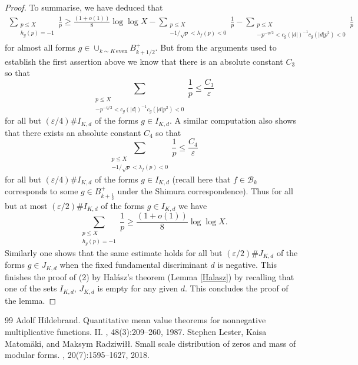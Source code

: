 \documentclass[10pt,a4paper]{amsart}
\newcommand\eps{\varepsilon}
\begin{document}
\begin{proof}
To summarise, we have deduced that 
\begin{align*}
\sum_{\substack{p\leq X\\
h_g(p)=-1}}\frac1p\geq\frac{(1+o(1))}{8}\log\log X-\sum_{\substack{p\leq X\\
-1/\sqrt p<\lambda_f(p)<0}}\frac1p-\sum_{\substack{p\leq X\\
-p^{-\eta/2}<c_g(|d|)^{-1}c_g(|d|p^2)<0}}\frac 1p
\end{align*}
for almost all forms $g\in\cup_{k\sim K\,\text{even}}B_{k+1/2}^+$. But from the arguments used to establish the first assertion above we know that there is an absolute constant $C_3$ so that
\[ 
\sum_{\substack{p\leq X\\
-p^{-\eta/2}<c_g(|d|)^{-1}c_g(|d|p^2)<0}}\frac 1p\leq\frac{C_3}{\varepsilon}\]
for all but $(\varepsilon/4)\# I_{K,d}$ of the forms $g\in I_{K,d}$. A similar computation also shows that there exists an absolute constant $C_4$ so that
\[ 
\sum_{\substack{p\leq X\\
-1/\sqrt p<\lambda_f(p)<0}}\frac1p\leq\frac{C_4}{\varepsilon}
\]
for all but $(\varepsilon/4)\# I_{K,d}$ of the forms $g\in I_{K,d}$ (recall here that $f\in\mathcal B_k$ corresponds to some $g\in B_{k+\frac12}^+$ under the Shimura correspondence). Thus for all but at most $(\eps/2)\#I_{K,d}$ of the forms $g\in I_{K,d}$ we have
\[
\sum_{\substack{p\leq X\\
h_g(p)=-1}}\frac1p\geq\frac{(1+o(1))}{8}\log\log X. 
\]
Similarly one shows that the same estimate holds for all but $(\varepsilon/2)\# J_{K,d}$ of the forms $g\in J_{K,d}$ when the fixed fundamental discriminant $d$ is negative. This finishes the proof of (2) by Hal\'asz's theorem (Lemma \ref{Halasz}) by recalling that one of the sets $I_{K,d},\,J_{K,d}$ is empty for any given $d$. This concludes the proof of the lemma. 

\end{proof}

\begin{thebibliography}{99}
 Adolf Hildebrand. \newblock Quantitative mean value theorems for nonnegative multiplicative functions. {II}. , 48(3):209--260, 1987.
 Stephen Lester, Kaisa Matom\"{a}ki, and Maksym Radziwi\l\l. \newblock Small scale distribution of zeros and mass of modular forms. , 20(7):1595--1627, 2018.
\end{thebibliography}
\end{document}

